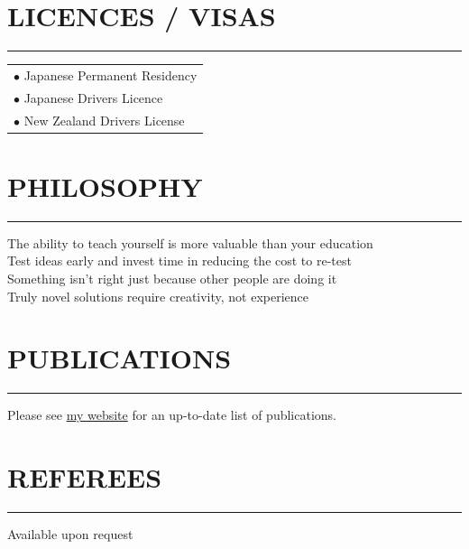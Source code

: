 \documentclass[english]{extarticle}
\newcommand{\mySect}[2]{
    \section*{\textcolor{secondary}{#1}\hfill{\footnotesize\textmd{{#2}}}}
    \vspace{-2em}
    \textcolor{tertiary}{\hrule}
    \vspace{0.5em}
}
\begin{document}
\vspace{1.0cm}

\mySect{LICENCES / VISAS}{}
\begin{tabular}{l}
$\bullet$ Japanese Permanent Residency \\
$\bullet$ Japanese Drivers Licence \\
$\bullet$ New Zealand Drivers License \\
\end{tabular}

\vspace{1.0cm}

\mySect{PHILOSOPHY}{}
\begin{centering}
\onehalfspacing
\noindent
The ability to teach yourself is more valuable than your education\\
\noindent
Test ideas early and invest time in reducing the cost to re-test\\
\noindent
Something isn't right just because other people are doing it\\
\noindent
Truly novel solutions require creativity, not experience\\
\end{centering}

\vspace{1.0cm}

\mySect{PUBLICATIONS}{}
\noindent
Please see \href{https://markhedleyjones.com/about}{my website} for an up-to-date list of publications.

\vspace{1.0cm}

\mySect{REFEREES}{}
\noindent
Available upon request
\end{document}
